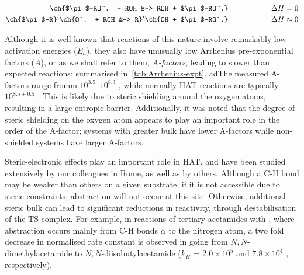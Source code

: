 
\begin{align}
  \ch{$\pi$-RO^. + ROH &-> ROH + $\pi$-RO^.} \hspace{2cm} \Delta H = 0 \\
  \ch{$\pi$-R}^\prime\ch{O^. + ROH &-> R}^\prime\ch{OH + $\pi$-RO^.} \hspace{2cm} \Delta H \approx 0
\end{align}

Although it is well known that reactions of this nature involve remarkably low activation energies ($E_a$),\cite{Lucarini1996,Mahoney1970a,Mahoney1975,Korcek1972} they also have unusually low Arrhenius pre-exponential factors ($A$), or as we shall refer to them, \emph{A-factors}, leading to slower than expected reactions; summarised in~\ref{tab:Arrhenius-expt}.
adThe measured A-factors range fromm $10^{3.5}$--$10^{8.3}$ \Ms, while normally HAT reactions are typically $10^{8.5\pm0.5}$ \Ms.\cite{Benson1976} This is likely due to steric shielding around the oxygen atoms, resulting in a large entropic barrier.\cite{DiLabio2005} Additionally, it was noted that the degree of steric shielding on the oxygen atom appears to play an important role in the order of the A-factor; systems with greater bulk have lower A-factors while non-shielded systems have larger A-factors.

Steric-electronic effects play an important role in HAT, and have been studied extensively by our colleagues in Rome, as well as by others.\cite{Finn2004,Salamone2011,Pischel2001,Griller1981,Bietti2011, Salamone2012,Malatesta1982,Salamone2014} Although a C-H bond may be weaker than others on a given substrate, if it is not accessible due to steric constraints, abstraction will not occur at this site. Otherwise, additional steric bulk can lead to significant reductions in reactivity, through destabilisation of the TS complex. For example, in reactions of tertiary acetamides with \cumo,\cite{Salamone2014} where abstraction occurs mainly from C-H bonds $\alpha$ to the nitrogen atom, a two fold decrease in normalised rate constant is observed in going from $N,N$-dimethylacetamide to $N,N$-diisobutylacetamide ($k_H$ = $2.0 \times 10^5$ and $7.8 \times 10^4$ \Ms, respectively).

